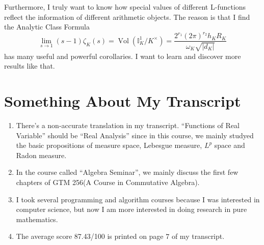 \documentclass[12pt]{article}
\newcommand{\bb}[1]{\mathbb{#1}}
\newenvironment{enu}{\begin{enumerate}[(1)]}{\end{enumerate}}
\theoremstyle{definition}
\begin{document}
Furthermore, I truly want to know how special values of different 
L-functions reflect the information of different arithmetic objects. 
The reason is that 
I find the Analytic Class Formula
$$
\lim_{s\rightarrow 1}(s-1)\zeta_K(s)=\operatorname{Vol}\left(\bb{I}_K^1/K^\times\right)=\frac{2^{r_1}(2\pi)^{r_2}h_K R_K}{\omega_K \sqrt{|d_K|}}
$$
has many useful and powerful corollaries. I want to learn and discover more results like that.

\section{Something About My Transcript}
\begin{enu} 
    \item There's a non-accurate translation in my transcript.
    “Functions of Real Variable” should be “Real Analysis” since in this course, we mainly studyed the basic 
    propositions of measure space, Lebesgue measure, $L^p$ space and Radon measure.
    \item In the course called “Algebra Seminar”, we mainly discuss the first few chapters of 
    GTM 256(A Course in Commutative Algebra).
    \item I took several programming and algorithm courses because I was interested in computer science, but now I am more interested in doing research in pure mathematics.
    \item The average score 87.43/100 is printed on page $7$ of my transcript.
\end{enu}
\end{document}
